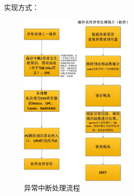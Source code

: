             实现方式：
            \begin{figure}[!hbp]
                    \centering
                    \caption{异常中断处理流程}
                    \includegraphics[width=0.5\textwidth]{chart/Exception.jpg}
            \end{figure}
            

